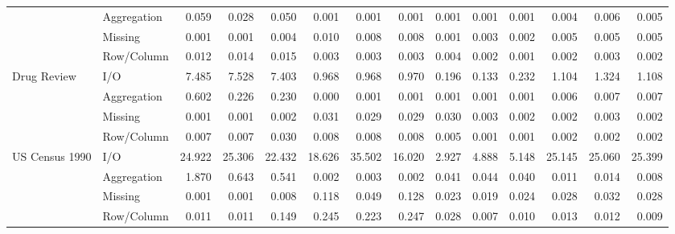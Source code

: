 \begin{tabular}{llrrrrrrrrrrrr}
 & Aggregation & 0.059 & 0.028 & 0.050 & 0.001 & 0.001 & 0.001 & 0.001 & 0.001 & 0.001 & 0.004 & 0.006 & 0.005 \\
 & Missing & 0.001 & 0.001 & 0.004 & 0.010 & 0.008 & 0.008 & 0.001 & 0.003 & 0.002 & 0.005 & 0.005 & 0.005 \\
 & Row/Column & 0.012 & 0.014 & 0.015 & 0.003 & 0.003 & 0.003 & 0.004 & 0.002 & 0.001 & 0.002 & 0.003 & 0.002 \\
\cline{1-14}
\multirow[t]{4}{*}{Drug Review} & I/O & 7.485 & 7.528 & 7.403 & 0.968 & 0.968 & 0.970 & 0.196 & 0.133 & 0.232 & 1.104 & 1.324 & 1.108 \\
 & Aggregation & 0.602 & 0.226 & 0.230 & 0.000 & 0.001 & 0.001 & 0.001 & 0.001 & 0.001 & 0.006 & 0.007 & 0.007 \\
 & Missing & 0.001 & 0.001 & 0.002 & 0.031 & 0.029 & 0.029 & 0.030 & 0.003 & 0.002 & 0.002 & 0.003 & 0.002 \\
 & Row/Column & 0.007 & 0.007 & 0.030 & 0.008 & 0.008 & 0.008 & 0.005 & 0.001 & 0.001 & 0.002 & 0.002 & 0.002 \\
\cline{1-14}
\multirow[t]{4}{*}{US Census 1990} & I/O & 24.922 & 25.306 & 22.432 & 18.626 & 35.502 & 16.020 & 2.927 & 4.888 & 5.148 & 25.145 & 25.060 & 25.399 \\
 & Aggregation & 1.870 & 0.643 & 0.541 & 0.002 & 0.003 & 0.002 & 0.041 & 0.044 & 0.040 & 0.011 & 0.014 & 0.008 \\
 & Missing & 0.001 & 0.001 & 0.008 & 0.118 & 0.049 & 0.128 & 0.023 & 0.019 & 0.024 & 0.028 & 0.032 & 0.028 \\
 & Row/Column & 0.011 & 0.011 & 0.149 & 0.245 & 0.223 & 0.247 & 0.028 & 0.007 & 0.010 & 0.013 & 0.012 & 0.009 \\
\cline{1-14}
\bottomrule
\end{tabular}
